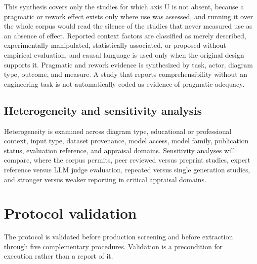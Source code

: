 This synthesis covers only the studies for which axis U is not absent, because a pragmatic or rework effect exists only where use was assessed, and running it over the whole corpus would read the silence of the studies that never measured use as an absence of effect. Reported context factors are classified as merely described, experimentally manipulated, statistically associated, or proposed without empirical evaluation, and causal language is used only when the original design supports it. Pragmatic and rework evidence is synthesized by task, actor, diagram type, outcome, and measure. A study that reports comprehensibility without an engineering task is not automatically coded as evidence of pragmatic adequacy.

\subsection{Heterogeneity and sensitivity analysis}

Heterogeneity is examined across diagram type, educational or professional context, input type, dataset provenance, model access, model family, publication status, evaluation reference, and appraisal domains. Sensitivity analyses will compare, where the corpus permits, peer reviewed versus preprint studies, expert reference versus LLM judge evaluation, repeated versus single generation studies, and stronger versus weaker reporting in critical appraisal domains.

\section{Protocol validation}
\label{sec:protocol_validation}

The protocol is validated before production screening and before extraction through five complementary procedures. Validation is a precondition for execution rather than a report of it.

